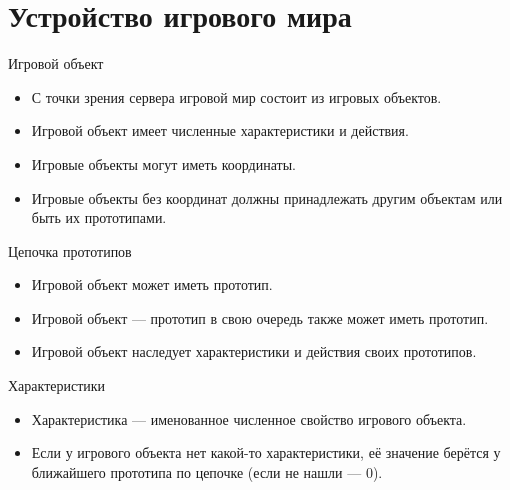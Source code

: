 \documentclass[aspectratio=169,handout,bigger]{beamer}
\begin{document}
\section{Устройство игрового мира}


\begin{frame}{Игровой объект}
  \begin{itemize}
    \item С точки зрения сервера игровой мир состоит из игровых объектов.
    \item Игровой объект имеет численные характеристики и действия.
    \item Игровые объекты могут иметь координаты.
    \item Игровые объекты без координат должны принадлежать другим объектам
          или быть их прототипами.
  \end{itemize}
\end{frame}


\begin{frame}{Цепочка прототипов}
  \begin{itemize}
    \item Игровой объект может иметь прототип.
    \item Игровой объект --- прототип в свою очередь также может иметь прототип.
    \item Игровой объект наследует характеристики и действия своих прототипов.
  \end{itemize}
\end{frame}


\begin{frame}{Характеристики}
  \begin{itemize}
    \item Характеристика --- именованное численное свойство игрового объекта.
    \item Если у игрового объекта нет какой-то характеристики,
          её значение берётся у ближайшего прототипа по цепочке
          (если не нашли --- 0).
  \end{itemize}
\end{frame}

\end{document}
